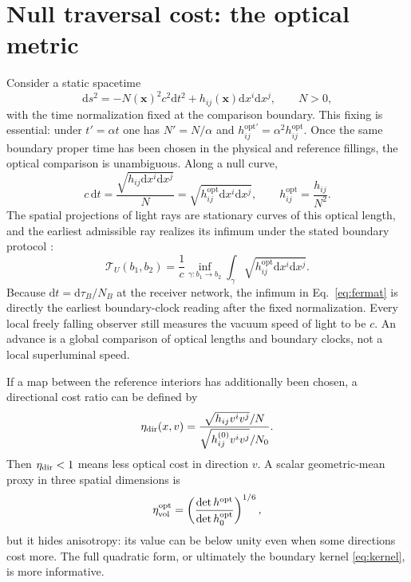 \documentclass[aps,prd,twocolumn,amsmath,amssymb,nofootinbib]{revtex4-2}
\newcommand{\dd}{\mathrm{d}}
\newcommand{\opt}{\mathrm{opt}}
\begin{document}
\section{Null traversal cost: the optical metric}
\label{sec:optical}

Consider a static spacetime
\begin{equation}
 \dd s^2=-N(\boldsymbol{x})^2c^2\dd t^2
 +h_{ij}(\boldsymbol{x})\dd x^i\dd x^j,
 \qquad N>0,
 \label{eq:staticmetric}
\end{equation}
with the time normalization fixed at the comparison boundary.  This fixing is
essential: under $t'=\alpha t$ one has $N'=N/\alpha$ and
$h^{\opt\prime}_{ij}=\alpha^2h^{\opt}_{ij}$.  Once the same boundary proper
time has been chosen in the physical and reference fillings, the optical
comparison is unambiguous.  Along a null curve,
\begin{equation}
 c\,\dd t
 =\frac{\sqrt{h_{ij}\dd x^i\dd x^j}}{N}
 =\sqrt{h^{\opt}_{ij}\dd x^i\dd x^j},
 \qquad h^{\opt}_{ij}=\frac{h_{ij}}{N^2}.
 \label{eq:opticalmetric}
\end{equation}
The spatial projections of light rays are stationary curves of this optical
length, and the earliest admissible ray realizes its infimum under the stated
boundary protocol \cite{perlick-1990-ii,gibbons-werner-2008}:
\begin{equation}
 \mathcal T_U(b_1,b_2)
 =\frac{1}{c}\inf_{\gamma:b_1\rightarrow b_2}
 \int_{\gamma}\sqrt{h^{\opt}_{ij}\dd x^i\dd x^j}.
 \label{eq:fermat}
\end{equation}
Because $\dd t=\dd\tau_B/N_B$ at the receiver network, the infimum in
Eq.~\eqref{eq:fermat} is directly the earliest boundary-clock reading after the
fixed normalization.  Every local freely falling observer still measures the
vacuum speed of light to be $c$.  An advance is a global comparison of optical
lengths and boundary clocks, not a local superluminal speed.

If a map between the reference interiors has additionally been chosen, a
directional cost ratio can be defined by
\begin{equation}
 \eta_{\rm dir}(x,v)=
 \frac{\sqrt{h_{ij}v^iv^j}/N}
 {\sqrt{h^{(0)}_{ij}v^iv^j}/N_0}.
 \label{eq:directionalcost}
\end{equation}
Then $\eta_{\rm dir}<1$ means less optical cost in direction $v$.  A scalar
geometric-mean proxy in three spatial dimensions is
\begin{equation}
 \eta_{\rm vol}^{\opt}
 =\left(\frac{\det h^{\opt}}{\det h^{\opt}_0}\right)^{1/6},
 \label{eq:optvolproxy}
\end{equation}
but it hides anisotropy: its value can be below unity even when some
directions cost more.  The full quadratic form, or ultimately the boundary
kernel \eqref{eq:kernel}, is more informative.
\end{document}
